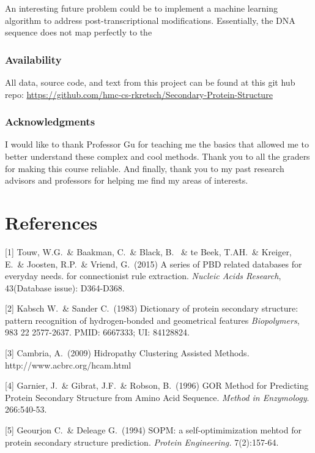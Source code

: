 \documentclass{article}
\begin{document}
An interesting future problem could be to implement a machine learning algorithm to address post-transcriptional modifications. Essentially, the DNA sequence does not map perfectly to the 


\subsubsection*{Availability}

All data, source code, and text from this project can be found at this git hub repo: \url{https://github.com/hmc-cs-rkretsch/Secondary-Protein-Structure}

\subsubsection*{Acknowledgments}

I would like to thank Professor Gu for teaching me the basics that allowed me to better understand these complex and cool methods. Thank you to all the graders for making this course reliable. And finally, thank you to my past research advisors and professors for helping me find my areas of interests.

\section*{References}

\small

[1] Touw, W.G.\ \& Baakman, C.\ \& Black, B. \ \& te Beek, T.AH.\ \& Kreiger, E.\ \& Joosten, R.P.\ \&
Vriend, G.\ (2015) A series of PBD related databases for everyday needs.
for connectionist rule extraction.  {\it Nucleic Acids Research}, 43(Database issue): D364-D368.

[2] Kabsch W.\ \& Sander C.\ (1983) Dictionary of protein secondary structure: pattern recognition of hydrogen-bonded and geometrical features {\it Biopolymers}, 983 22 2577-2637. PMID: 6667333; UI: 84128824.

[3] Cambria, A.\ (2009) Hidropathy Clustering Assisted Methods. http://www.acbrc.org/hcam.html

[4] Garnier, J.\ \& Gibrat, J.F.\ \& Robson, B.\ (1996) GOR Method for Predicting Protein Secondary Structure from Amino Acid Sequence. {\it Method in Enzymology}. 266:540-53.

[5] Geourjon C.\ \& Deleage G.\ (1994) SOPM: a self-optimimization mehtod for protein secondary structure prediction. {\it Protein Engineering.} 7(2):157-64.
\end{document}
